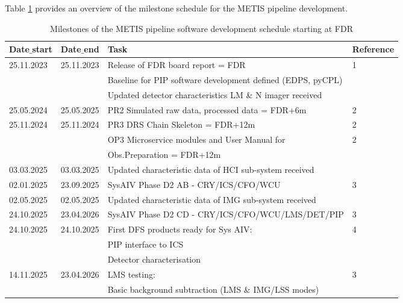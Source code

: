 Table \ref{tab:development_schedule} provides an overview of the milestone schedule for the METIS pipeline development.

\begin{table}
    \caption[Development schedule]{Milestones of the METIS pipeline software development schedule starting at FDR}
  \label{tab:development_schedule}

\centering
\scriptsize
\begin{tabularx}{\textwidth}{llll}

\hline
Date$\_$start &	Date$\_$end   &	Task                            &		Reference \\
\hline\hline
25.11.2023 & 25.11.2023 &	Release of FDR board report = FDR        &	1 \\
	  &		   &	Baseline for PIP software development defined (EDPS, pyCPL) &	\\
    &    	 &    Updated detector characteristics LM \& N imager received    &	\\
\hline
25.05.2024 & 25.05.2025 &	PR2 Simulated raw data, processed data = FDR+6m &	2 \\
\hline
25.11.2024 & 25.11.2024 &	PR3 DRS Chain Skeleton = FDR+12m     &	2 \\
	&		 &	OP3 Microservice modules and User Manual for                &	2 \\
    &        &  Obs.Preparation = FDR+12m                                 &	\\
\hline
03.03.2025 & 03.03.2025 &	Updated characteristic data of HCI sub-system received      & 	\\
\hline
02.01.2025 & 23.09.2025 &	SysAIV Phase D2 AB - CRY/ICS/CFO/WCU          &	3 \\
\hline
02.05.2025 & 02.05.2025 &	Updated characteristic data of IMG sub-system received	    &   \\
\hline
24.10.2025 & 23.04.2026 &	SysAIV Phase D2 CD - CRY/ICS/CFO/WCU/LMS/DET/PIP            &	3 \\
\hline
24.10.2025 & 24.10.2025 &	First DFS products ready for Sys AIV:            &	4 \\
    &          &  PIP interface to ICS                                        &	\\
    &          &  Detector characterisation                                   &	\\
\hline
14.11.2025 & 23.04.2026 &	LMS testing:                                      &	3 \\ 
    &          & Basic background subtraction (LMS \& IMG/LSS modes)          &	\\

\end{tabularx}
\end{table}
